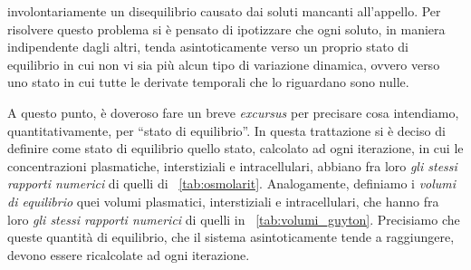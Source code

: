involontariamente un disequilibrio causato dai soluti mancanti all'appello. Per risolvere questo problema si è pensato di ipotizzare che ogni soluto, in maniera indipendente dagli altri, tenda asintoticamente verso un proprio stato di equilibrio in cui non vi sia più alcun tipo di variazione dinamica, ovvero verso uno stato in cui tutte le derivate temporali che lo riguardano sono nulle.

A questo punto, è doveroso fare un breve \textit{excursus} per precisare cosa intendiamo, quantitativamente, per ``stato di equilibrio''. In questa trattazione si è deciso di definire come stato di equilibrio quello stato, calcolato ad ogni iterazione, in cui le concentrazioni plasmatiche, interstiziali e intracellulari, abbiano fra loro \textit{gli stessi rapporti numerici} di quelli di \tablename~\ref{tab:osmolarit}. Analogamente, definiamo i \textit{volumi di equilibrio} quei volumi plasmatici, interstiziali e intracellulari, che hanno fra loro \textit{gli stessi rapporti numerici} di quelli in \tablename~\ref{tab:volumi_guyton}. Precisiamo che queste quantità di equilibrio, che il sistema asintoticamente tende a raggiungere, devono essere ricalcolate ad ogni iterazione.


